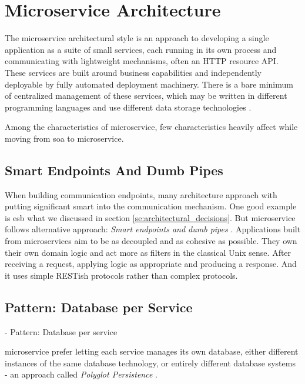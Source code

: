\section{Microservice Architecture}

The microservice architectural style is an approach to developing a single application as a suite of small services, each running in its own process and communicating with lightweight mechanisms, often an HTTP resource API. These services are built around business capabilities and independently deployable by fully automated deployment machinery. There is a bare minimum of centralized management of these services, which may be written in different programming languages and use different data storage technologies \cite{LewisMicroservices}.

Among the characteristics of \acrfull{microservice}, few characteristics heavily affect while moving from \acrshort{soa} to \acrshort{microservice}.
\subsection{Smart Endpoints And Dumb Pipes}
\label{subse:dumb_pipes}
When building communication endpoints, many architecture approach with putting significant smart into the communication mechanism. One good example is \acrshort{esb} what we discussed in section \ref{se:architectural_decisions}. But microservice follows alternative approach: \emph{Smart endpoints and dumb pipes} \cite{LewisMicroservicesPipes}.
Applications built from microservices aim to be as decoupled and as cohesive as possible. They own their own domain logic and act more as filters in the classical Unix sense. After receiving a request, applying logic as appropriate and producing a response. And it uses simple RESTish protocols rather than complex protocols.

\subsection{Pattern: Database per Service}
\label{subse:database_per_service}
- Pattern: Database per service 

\acrshort{microservice} prefer letting each service manages its own database, either different instances of the same database technology, or entirely different database systems - an approach called \emph{Polyglot Persistence} \cite{LewisMicroservicesManagement}.

